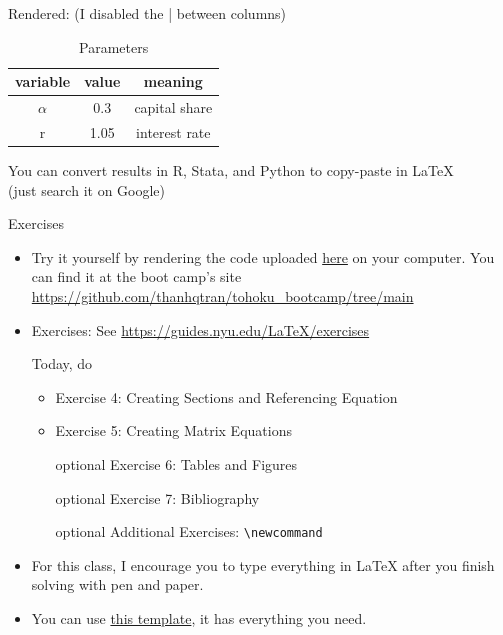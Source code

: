 \documentclass[
11pt, %
]{beamer}
\begin{document}
	
	\begin{frame}
		Rendered: (I disabled the | between columns)
		\begin{table}
			\centering
			\begin{tabular}{c  c  c}
				\toprule 
				variable & value & meaning \\
				\midrule
				$\alpha$ & 0.3 & capital share \\
				r & 1.05 & interest rate \\
				\bottomrule
			\end{tabular}
			\caption{Parameters}
		\end{table}
		You can convert results in R, Stata, and Python to copy-paste in \LaTeX \\
		(just search it on Google)
	\end{frame}
	
	\begin{frame}{Exercises}
		\begin{itemize}
			\item Try it yourself by rendering the code uploaded \href{https://github.com/thanhqtran/tohoku_bootcamp/tree/main/tex_guide}{here} on your computer.
			You can find it at the boot camp's site \url{https://github.com/thanhqtran/tohoku_bootcamp/tree/main}
			
			\item Exercises: See \href{https://guides.nyu.edu/LaTeX/exercises}{\url{https://guides.nyu.edu/LaTeX/exercises}}
			
			Today, do 
			\begin{itemize}
				\item Exercise 4: Creating Sections and Referencing Equation
				\item Exercise 5: Creating Matrix Equations
				\item [optional] Exercise 6: Tables and Figures
				\item [optional] Exercise 7: Bibliography
				\item [optional] Additional Exercises: \texttt{\textbackslash newcommand}
			\end{itemize}
			
			\item For this class, I encourage you to type everything in \LaTeX{} after you finish solving with pen and paper.
			\item You can use \href{https://github.com/thanhqtran/tohoku_bootcamp/blob/main/tex_guide/template.tex}{this template}, it has everything you need.
			
		\end{itemize}
	\end{frame}
	
\end{document}
